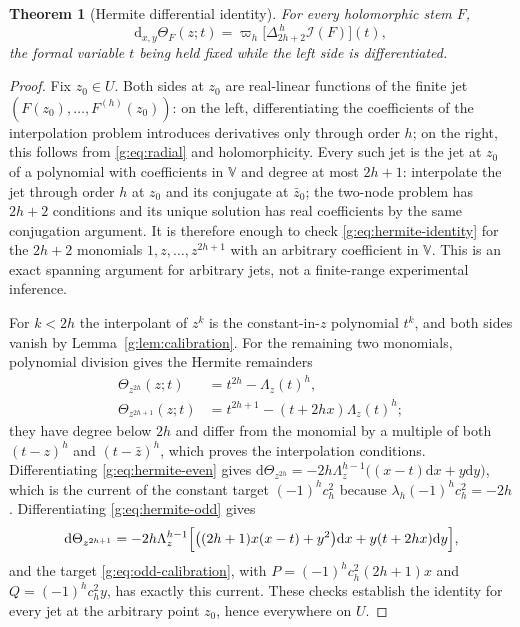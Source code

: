 \documentclass[11pt,a4paper]{article}
\numberwithin{equation}{section}
\newtheorem{theorem}{Theorem}[section]
\theoremstyle{definition}
\theoremstyle{remark}
\theoremstyle{plain}
\newcommand{\I}{\mathcal I}
\newcommand{\dd}{\mathrm d}
\newcommand{\lapH}{\Delta_{2h+2}^{\,h}}
\newcommand{\VV}{\mathbb V}                       %
\newcommand{\cur}{\varpi}                         %
\newcommand{\Herm}{\Theta}                        %
\newcommand{\Rq}{\Lambda}                         %
\begin{document}
\begin{theorem}[Hermite differential identity]
\label{g:thm:hermite}
For every holomorphic stem $F$,
\begin{equation}\label{g:eq:hermite-identity}
 \dd_{x,y}\Herm_F(z;t)=\cur_h\bigl[\lapH\I(F)\bigr](t),
\end{equation}
the formal variable $t$ being held fixed while the left side is
differentiated.
\end{theorem}

\begin{proof}
Fix $z_0\in U$. Both sides at $z_0$ are real-linear functions of the finite
jet $(F(z_0),\dots,F^{(h)}(z_0))$: on the left, differentiating the
coefficients of the interpolation problem introduces derivatives only through
order $h$; on the right, this follows from \eqref{g:eq:radial} and
holomorphicity. Every such jet is the jet at $z_0$ of a polynomial with
coefficients in $\VV$ and degree at most $2h+1$: interpolate the jet through
order $h$ at $z_0$ and its conjugate at $\bar z_0$; the two-node problem has
$2h+2$ conditions and its unique solution has real coefficients by the same
conjugation argument. It is therefore enough to check
\eqref{g:eq:hermite-identity} for the $2h+2$ monomials $1,z,\dots,z^{2h+1}$
with an arbitrary coefficient in $\VV$. This is an exact spanning argument for
arbitrary jets, not a finite-range experimental inference.

For $k<2h$ the interpolant of $z^k$ is the constant-in-$z$ polynomial $t^k$,
and both sides vanish by Lemma~\ref{g:lem:calibration}. For the remaining two
monomials, polynomial division gives the Hermite remainders
\begin{align}
 \Herm_{z^{2h}}(z;t)&=t^{2h}-\Rq_z(t)^h,\label{g:eq:hermite-even}\\
 \Herm_{z^{2h+1}}(z;t)&=t^{2h+1}-(t+2hx)\Rq_z(t)^h;
 \label{g:eq:hermite-odd}
\end{align}
they have degree below $2h$ and differ from the monomial by a multiple of
both $(t-z)^h$ and $(t-\bar z)^h$, which proves the interpolation conditions.
Differentiating \eqref{g:eq:hermite-even} gives
$\dd\Herm_{z^{2h}}=-2h\Rq_z^{h-1}\bigl((x-t)\dd x+y\dd y\bigr)$, which is the
current of the constant target $(-1)^hc_h^2$ because
$\lambda_h(-1)^hc_h^2=-2h$. Differentiating \eqref{g:eq:hermite-odd} gives
\[
 \dd\Herm_{z^{2h+1}}=-2h\Rq_z^{h-1}\Bigl[\bigl((2h+1)x(x-t)+y^2\bigr)\dd x
 +y(t+2hx)\dd y\Bigr],
\]
and the target \eqref{g:eq:odd-calibration}, with
$P=(-1)^hc_h^2(2h+1)x$ and $Q=(-1)^hc_h^2y$, has exactly this current. These
checks establish the identity for every jet at the arbitrary point $z_0$,
hence everywhere on $U$.
\end{proof}
\end{document}
